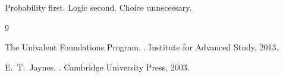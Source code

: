 \documentclass[11pt,a4paper]{article}
\begin{document}
Probability first. Logic second. Choice unnecessary.

\begin{thebibliography}{9}

The {Univalent Foundations Program}.
.
\newblock Institute for Advanced Study, 2013.

E.~T.~Jaynes.
.
\newblock Cambridge University Press, 2003.

\end{thebibliography}
\end{document}
